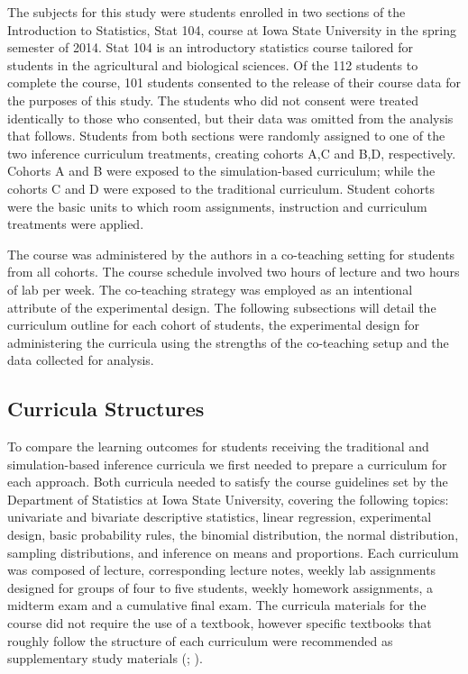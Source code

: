 The subjects for this study were students enrolled in two sections of the Introduction to Statistics, Stat 104, course at Iowa State University in the spring semester of 2014. Stat 104 is an introductory statistics course tailored for students in the agricultural and biological sciences. Of the 112 students to complete the course, 101 students consented to the release of their course data for the purposes of this study.   The students who did not consent were treated identically to those who consented, but their data was omitted from the analysis that follows.  Students from both sections were randomly assigned to one of the two inference curriculum treatments, creating cohorts A,C and B,D, respectively. Cohorts A and B were exposed to the simulation-based curriculum; while the cohorts C and D were exposed to the traditional curriculum. Student cohorts were the basic units to which room assignments, instruction and curriculum treatments were applied.

The course was administered by the authors in a co-teaching setting for students from all cohorts. The course schedule involved two hours of lecture and two hours of lab per week.  The co-teaching strategy was employed as an intentional attribute of the experimental design. The following subsections will detail the curriculum outline for each cohort of students, the experimental design for administering the curricula using the strengths of the co-teaching setup and the data collected for analysis.
\subsection{Curricula Structures}
\label{curric}

To compare the learning outcomes for students receiving the traditional and simulation-based inference curricula we first needed to prepare a curriculum for each approach.  Both curricula needed to satisfy the course guidelines set by the Department of Statistics at Iowa State University, covering the following topics: univariate and bivariate descriptive statistics, linear regression, experimental design, basic probability rules, the binomial distribution, the normal distribution, sampling distributions, and inference on means and proportions. Each curriculum was composed of lecture, corresponding lecture notes, weekly lab assignments designed for groups of four to five students, weekly homework assignments, a midterm exam and a cumulative final exam.  The curricula materials for the course did not require the use of a textbook, however specific textbooks that roughly follow the structure of each curriculum were recommended as supplementary study materials (\citealt{AgrestiFranklin}; \citealt{Lock5}).

